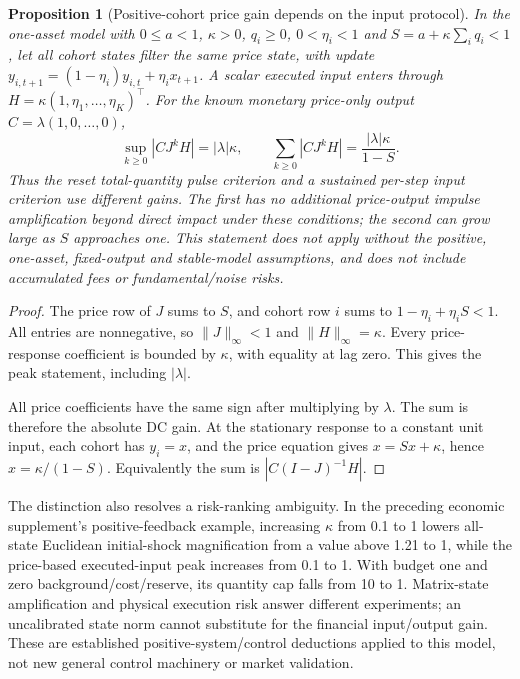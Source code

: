 \documentclass[11pt]{article}
\newtheorem{proposition}{Proposition}
\begin{document}
\begin{proposition}[Positive-cohort price gain depends on the input protocol]
In the one-asset model with $0\le a<1$, $\kappa>0$, $q_i\ge0$, $0<\eta_i<1$ and $S=a+\kappa\sum_iq_i<1$, let all cohort states filter the same price state, with update $y_{i,t+1}=(1-\eta_i)y_{i,t}+\eta_i x_{t+1}$. A scalar executed input enters through $H=\kappa(1,\eta_1,\ldots,\eta_K)^\top$. For the known monetary price-only output $C=\lambda(1,0,\ldots,0)$,
\[
\sup_{k\ge0}|CJ^kH|=|\lambda|\kappa,
\qquad
\sum_{k\ge0}|CJ^kH|=\frac{|\lambda|\kappa}{1-S}.
\]
Thus the reset total-quantity pulse criterion and a sustained per-step input criterion use different gains. The first has no additional price-output impulse amplification beyond direct impact under these conditions; the second can grow large as $S$ approaches one. This statement does not apply without the positive, one-asset, fixed-output and stable-model assumptions, and does not include accumulated fees or fundamental/noise risks.
\end{proposition}
\begin{proof}
The price row of $J$ sums to $S$, and cohort row $i$ sums to $1-\eta_i+\eta_iS<1$. All entries are nonnegative, so $\|J\|_\infty<1$ and $\|H\|_\infty=\kappa$. Every price-response coefficient is bounded by $\kappa$, with equality at lag zero. This gives the peak statement, including $|\lambda|$.

All price coefficients have the same sign after multiplying by $\lambda$. The sum is therefore the absolute DC gain. At the stationary response to a constant unit input, each cohort has $y_i=x$, and the price equation gives $x=Sx+\kappa$, hence $x=\kappa/(1-S)$. Equivalently the sum is $|C(I-J)^{-1}H|$.
\end{proof}

The distinction also resolves a risk-ranking ambiguity. In the preceding economic supplement's positive-feedback example, increasing $\kappa$ from 0.1 to 1 lowers all-state Euclidean initial-shock magnification from a value above 1.21 to 1, while the price-based executed-input peak increases from 0.1 to 1. With budget one and zero background/cost/reserve, its quantity cap falls from 10 to 1. Matrix-state amplification and physical execution risk answer different experiments; an uncalibrated state norm cannot substitute for the financial input/output gain. These are established positive-system/control deductions applied to this model, not new general control machinery or market validation.
\end{document}

